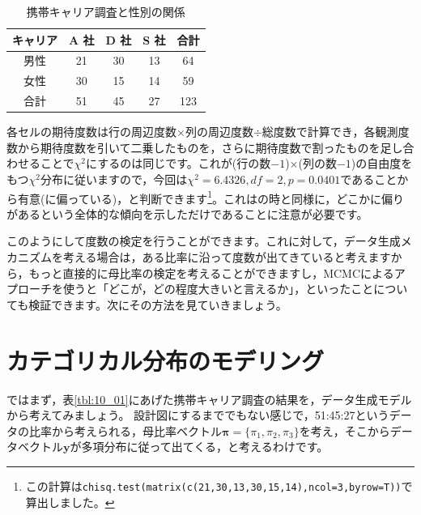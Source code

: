 \documentclass{ltjsbook}
\begin{document}
\begin{table}[ht]
	\centering
	\caption{携帯キャリア調査と性別の関係}
	\begin{tabular}{c|ccc|c}
		キャリア & A 社 & D 社 & S 社 & 合計  \\\hline
		男性   & 21  & 30  & 13  & 64  \\
		女性   & 30  & 15  & 14  & 59  \\\hline
		合計   & 51  & 45  & 27  & 123 \\
	\end{tabular}
	\label{tbl:10_02}
\end{table}

各セルの期待度数は行の周辺度数$\times$列の周辺度数$\div$総度数で計算でき，各観測度数から期待度数を引いて二乗したものを，さらに期待度数で割ったものを足し合わせることで$\chi^2$にするのは同じです。これが(行の数$-1$)$\times$(列の数$-1$)の自由度をもつ$\chi^2$分布に従いますので，今回は$\chi^2=6.4326,df=2,p=0.0401$であることから有意(に偏っている)，と判断できます\footnote{この計算は\verb|chisq.test(matrix(c(21,30,13,30,15,14),ncol=3,byrow=T))|で算出しました。}。これはの時と同様に，どこかに偏りがあるという全体的な傾向を示しただけであることに注意が必要です。

このようにして度数の検定を行うことができます。これに対して，データ生成メカニズムを考える場合は，ある比率に沿って度数が出てきていると考えますから，もっと直接的に母比率の検定を考えることができますし，MCMCによるアプローチを使うと「どこが，どの程度大きいと言えるか」，といったことについても検証できます。次にその方法を見ていきましょう。

\section{カテゴリカル分布のモデリング}
ではまず，表\ref{tbl:10_01}にあげた携帯キャリア調査の結果を，データ生成モデルから考えてみましょう。
設計図にするまででもない感じで，51:45:27というデータの比率から考えられる，母比率ベクトル$\bm{\pi} = \{ \pi_1,\pi_2,\pi_3 \}$を考え，そこからデータベクトル$\bm{y}$が多項分布に従って出てくる，と考えるわけです。
\end{document}
